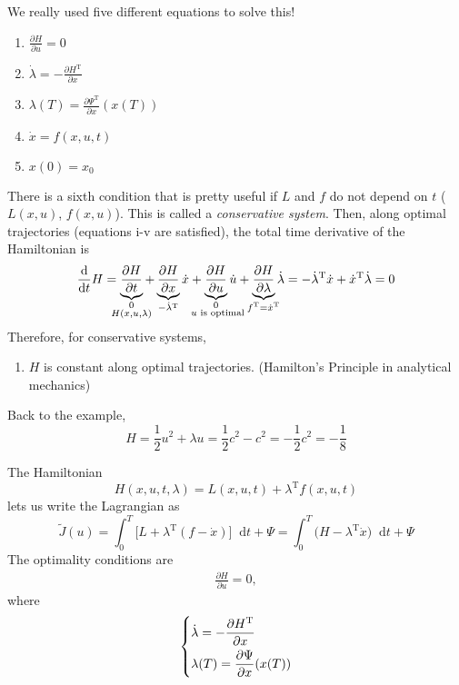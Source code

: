 \documentclass[letterpaper,12pt,titlepage]{report}
\newcommand*\dif{\mathop{}\!\mathrm{d}}
\newcommand{\trans}{^\text{T}}
\newcommand*\pder[2]{\frac{\partial #1}{\partial #2}}
\theoremstyle{plain}
\theoremstyle{definition}
\begin{document}
We really used five different equations to solve this!
\begin{enumerate}[label=\roman*)]
\item $\displaystyle \pder{H}{u} = 0$
\item $\displaystyle \dot\lambda = - \pder{H\trans}{x}$
\item $\displaystyle \lambda(T) = \pder{\Psi\trans}{x}(x(T))$
\item $\dot x = f(x,u,t)$
\item $x(0) = x_0$
\end{enumerate}
There is a sixth condition that is pretty useful if $L$ and $f$ do not depend on $t$ ($L(x,u)$, $f(x,u)$). This is called a \emph{conservative system}. Then, along optimal trajectories (equations i-v are satisfied), the total time derivative of the Hamiltonian is
\[
  \frac{\dif}{\dif t} H = \underbrace{\pder{H}{t}}_{\mathclap{\substack{0\\ H(x,u,\lambda)}}} + \underbrace{\pder{H}{x}}_{-\dot\lambda\trans} \dot x + \underbrace{\pder{H}{u}}_{\mathclap{\substack{0\\ \text{ $u$ is optimal}}}} \dot u + \underbrace{\pder{H}{\lambda}}_{\mathclap{f\trans=\dot x\trans}} \dot\lambda
  = -\dot\lambda\trans \dot x + \dot x\trans \dot\lambda = 0
\]
Therefore, for conservative systems,
\begin{enumerate}[resume*]
\item $H$ is constant along optimal trajectories. (Hamilton's Principle in analytical mechanics)
\end{enumerate}
Back to the example,
\[ H = \frac12 u^2 + \lambda u = \frac12 c^2 - c^2 = -\frac12 c^2 = -\frac18 \]

The Hamiltonian
\[ H(x,u,t,\lambda) = L(x,u,t) + \lambda\trans f(x,u,t) \]
lets us write the Lagrangian as
\[ \tilde J(u) = \int_0^T \big[ L + \lambda\trans(f-\dot x) \big] \dif t + \Psi = \int_0^T \big(H - \lambda\trans \dot x \big) \dif t + \Psi \]
The optimality conditions are
\begin{gather}
  \pder{H}{u} = 0,
  \label{eq:Hoptcond}
\end{gather}
where
\begin{gather}
  \begin{dcases}
    \dot\lambda = -\pder{H\trans}{x} \\
    \lambda(T) = \pder{\Psi}{x}(x(T))
  \end{dcases}
  \label{eq:Hoptcond2}
\end{gather}
\end{document}
